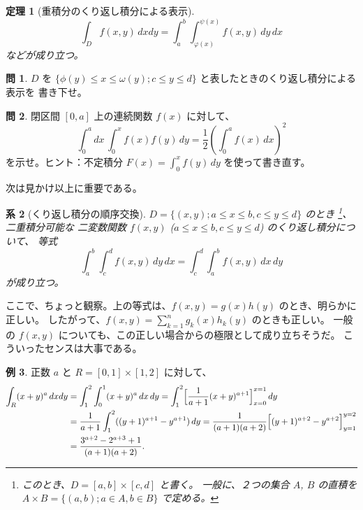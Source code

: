 \documentclass[a4paper]{jsarticle}
\newtheorem{Theorem}{定理}[section]
\newtheorem{Corollary}[Theorem]{系}
\theoremstyle{definition}
\newtheorem{Example}[Theorem]{例}
\newtheorem{Exercise}{問}%
\theoremstyle{remark}
\begin{document}
\begin{Theorem}[重積分のくり返し積分による表示]
\[
\int_D f(x,y)\, dxdy = \int_a^b \int_{\varphi(x)}^{\psi(x)} f(x,y)\, dy\, dx
\]
などが成り立つ。
\end{Theorem}

\begin{Exercise}
$D$ を $\{ \phi(y) \leq x \leq \omega(y); c \leq y \leq d \}$ と表したときのくり返し積分による表示を
書き下せ。
\end{Exercise} 

\begin{Exercise}
 閉区間 $[0,a]$ 上の連続関数 $f(x)$ に対して、
  \[
    \int_0^a dx\, \int_0^x f(x) f(y)\, dy = \frac{1}{2} \left( \int_0^a f(x)\, dx \right)^2
  \]
  を示せ。ヒント：不定積分 $F(x) = \int_0^x f(y)\, dy$ を使って書き直す。
\end{Exercise}

次は見かけ以上に重要である。

\begin{Corollary}[くり返し積分の順序交換]
$D = \{ (x,y); a \leq x \leq b, c \leq y \leq d\}$ のとき
\footnote{このとき、$D = [a,b]\times [c,d]$ と書く。
一般に、２つの集合 $A$, $B$ の直積を 
$A\times B = \{ (a,b); a \in A, b \in B \}$ で定める。}、二重積分可能な
二変数関数 $f(x,y)$ {\rm ($a \leq x \leq b, c \leq y \leq d$)} のくり返し積分について、
等式
\[
\int_a^b \int_c^d f(x,y)\, dy\, dx 
= \int_c^d \int_a^b f(x,y)\, dx\, dy 
\]
が成り立つ。
\end{Corollary}

ここで、ちょっと観察。上の等式は、$f(x,y) = g(x)h(y)$ のとき、明らかに正しい。
したがって、$f(x,y) = \sum_{k=1}^n g_k(x)h_k(y)$ のときも正しい。
一般の $f(x,y)$ についても、この正しい場合からの極限として成り立ちそうだ。
こういったセンスは大事である。


\begin{Example}
正数 $a$ と $R = [0,1]\times [1,2]$ に対して、
\begin{align*}
\int_R (x+y)^a\,dxdy 
&= \int_1^2 \int_0^1 (x+y)^a\, dx\, dy 
= \int_1^2 \Bigl[ \frac{1}{a+1} (x+y)^{a+1} \Bigr]_{x=0}^{x=1}\, dy\\ 
&= \frac{1}{a+1} \int_1^2 ((y+1)^{a+1} - y^{a+1})\, dy 
= \frac{1}{(a+1)(a+2)} \Bigl[ (y+1)^{a+2} - y^{a+2} \Bigr]_{y=1}^{y=2}\\ 
&= \frac{3^{a+2} - 2^{a+3} + 1}{(a+1)(a+2)}. 
\end{align*}
\end{Example}
\end{document}
